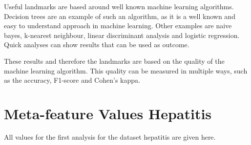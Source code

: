 \documentclass[10pt,a4paper]{article}
\begin{document}
	Useful landmarks are based around well known machine learning algorithms. Decision trees are an example of such an algorithm, as it is a well known and easy to understand approach in machine learning.  Other examples are naive bayes, k-nearest neighbour, linear discriminant analysis and logistic regression. Quick analyses can show results that can be used as outcome.
	
	These results and therefore the landmarks are based on the quality of the machine learning algorithm. This quality can be measured in multiple ways, such as the accuracy, F1-score and Cohen's kappa.
	
	\section{Meta-feature Values Hepatitis}
	\label{app:MetafeatureValuesHepatitis}
	
	All values for the first analysis for the dataset hepatitis are given here.
	
\end{document}
